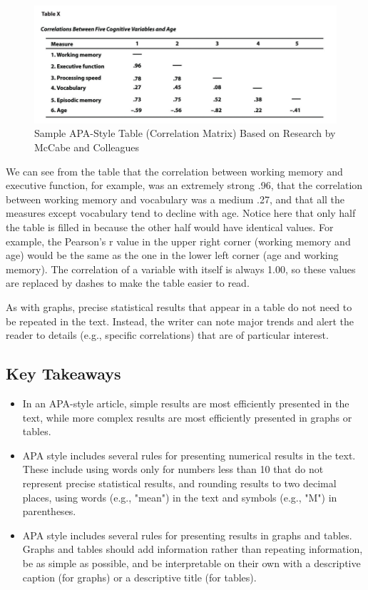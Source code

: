 \begin{figure}
\includegraphics[width=\linewidth]{figures/Fig12-15}
\caption{Sample APA-Style Table (Correlation Matrix) Based on Research by McCabe and Colleagues}
\label{fig:cormat}
\end{figure}

We can see from the table that the correlation between working memory and executive function, for example, was an extremely strong .96, that the correlation between working memory and vocabulary was a medium .27, and that all the measures except vocabulary tend to decline with age. Notice here that only half the table is filled in because the other half would have identical values. For example, the Pearson's r value in the upper right corner (working memory and age) would be the same as the one in the lower left corner (age and working memory). The correlation of a variable with itself is always 1.00, so these values are replaced by dashes to make the table easier to read.


As with graphs, precise statistical results that appear in a table do not need to be repeated in the text. Instead, the writer can note major trends and alert the reader to details (e.g., specific correlations) that are of particular interest.

\subsection{Key Takeaways}
\begin{fullwidth}
\begin{itemize}
\item In an APA-style article, simple results are most efficiently presented in the text, while more complex results are most efficiently presented in graphs or tables.

\item APA style includes several rules for presenting numerical results in the text. These include using words only for numbers less than 10 that do not represent precise statistical results, and rounding results to two decimal places, using words (e.g., "mean") in the text and symbols (e.g., "M") in parentheses.

\item APA style includes several rules for presenting results in graphs and tables. Graphs and tables should add information rather than repeating information, be as simple as possible, and be interpretable on their own with a descriptive caption (for graphs) or a descriptive title (for tables).

\end{itemize}
\end{fullwidth}



